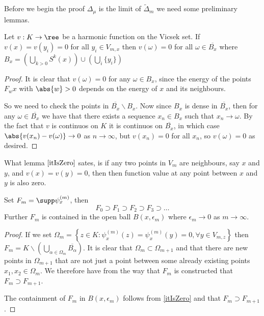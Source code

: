 Before we begin the proof $\Delta_{\mu}$ is the limit of $\widetilde{\Delta}_{m}$ we need some preliminary lemmas.

\begin{lemma}\label{itIsZero}
	Let $v: K \to \ree$ be a harmonic function on the Vicsek set. If $v(x) = v(y_i) = 0$ for all $y_i \in V_{m,x}$ then $v(\omega) = 0$ for all $\omega \in \overline{B_x}$ where $B_x = \left( \bigcup_{k > 0} S^{k}(x) \right) \cup \left(\bigcup_{i} \{y_i\} \right)$
\end{lemma}
\begin{proof}
	It is clear that $v(\omega) = 0$ for any $\omega \in B_x$, since the energy of the points $F_w x$ with $\abs{w} > 0$ depends on the energy of $x$ and its neighbours. 
	
	So we need to check the points in $\overline{B_x} \backslash B_x$. Now since $B_x$ is dense in $\overline{B_x}$, then for any $\omega \in \overline{B_x}$ we have that there exists a sequence $x_n \in B_x$ such that $x_n \to \omega$. By the fact that $v$ is continuos on $K$ it is continuos on $\overline{B_x}$, in which case $\abs{v(x_n) - v(\omega)} \to 0$ as $n \to \infty$, but $v(x_n) = 0$ for all $x_n$, so $v(\omega) = 0$ as desired.  
\end{proof}

What lemma $\ref{itIsZero}$ sates, is if any two points in $V_m$ are neighbours, say $x$ and $y$, and $v(x)=v(y)=0$, then then function value at any point between $x$ and $y$ is also zero.

\begin{lemma}\label{FmSmaller}
	Set $F_m = \supp \psi_{x}^{(m)}$, then
	\begin{equation}
		F_0 \supset F_1 \supset F_2 \supset F_3 \supset \dots
	\end{equation}
	Further $F_m$ is contained in the open ball $B(x, \epsilon_m)$ where $\epsilon_m \to 0$ as $m \to \infty$.
\end{lemma}

\begin{proof}
	If we set $\Omega_m = \left\{z \in K : \psi_{x}^{(m)}(z) = \psi_{x}^{(m)}(y) = 0, \forall y \in V_{m,z}  \right\}$ then $F_m = K \backslash \left(\bigcup_{\alpha \in \Omega_m} \overline{B_\alpha} \right)$. It is clear that $\Omega_m \subset \Omega_{m+1}$ and that there are new points in $\Omega_{m+1}$ that are not just a point between some already existing points $x_1, x_2 \in \Omega_m$. We therefore have from the way that $F_m$ is constructed that $F_m \supset F_{m+1}$.
	
	The containment of $F_m$ in $B(x, \epsilon_m)$ follows from \cref{itIsZero} and that $F_m \supset F_{m+1}$.
\end{proof}

